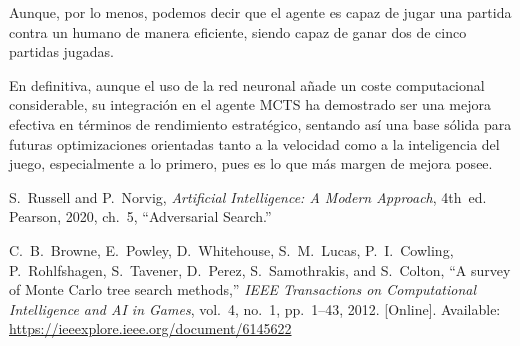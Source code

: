 \documentclass[conference]{IEEEtran}
\begin{document}
Aunque, por lo menos, podemos decir que el agente es capaz de jugar una partida contra un humano de manera eficiente, siendo capaz de ganar dos de cinco partidas jugadas.

En definitiva, aunque el uso de la red neuronal añade un coste computacional considerable, su integración en el agente MCTS ha demostrado ser una mejora efectiva en términos de rendimiento estratégico, sentando así una base sólida para futuras optimizaciones orientadas tanto a la velocidad como a la inteligencia del juego, especialmente a lo primero, pues es lo que más margen de mejora posee.

\begin{thebibliography}{99}

S.~Russell and P.~Norvig, \emph{Artificial Intelligence: A Modern Approach}, 4th~ed. Pearson, 2020, ch.~5, ``Adversarial Search.''

C.~B.~Browne, E.~Powley, D.~Whitehouse, S.~M.~Lucas, P.~I.~Cowling, P.~Rohlfshagen, S.~Tavener, D.~Perez, S.~Samothrakis, and S.~Colton, ``A survey of Monte Carlo tree search methods,'' \emph{IEEE Transactions on Computational Intelligence and AI in Games}, vol.~4, no.~1, pp.~1--43, 2012. [Online]. Available: \url{https://ieeexplore.ieee.org/document/6145622}

\end{thebibliography}


\end{document}
